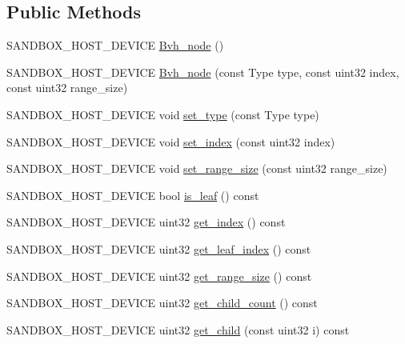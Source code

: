 \subsection*{Public Methods}
\begin{DoxyCompactItemize}
\item 
S\+A\+N\+D\+B\+O\+X\+\_\+\+H\+O\+S\+T\+\_\+\+D\+E\+V\+I\+CE \hyperlink{structsandbox_1_1_bvh__node_3_01_compact__bvh__tag_01_4_a1ace7c8c3d0c5ad6cca5fc6efa95a7bd}{Bvh\+\_\+node} ()
\item 
S\+A\+N\+D\+B\+O\+X\+\_\+\+H\+O\+S\+T\+\_\+\+D\+E\+V\+I\+CE \hyperlink{structsandbox_1_1_bvh__node_3_01_compact__bvh__tag_01_4_a9914c08eee2f15682cd6eba7d930ff07}{Bvh\+\_\+node} (const Type type, const uint32 index, const uint32 range\+\_\+size)
\item 
S\+A\+N\+D\+B\+O\+X\+\_\+\+H\+O\+S\+T\+\_\+\+D\+E\+V\+I\+CE void \hyperlink{structsandbox_1_1_bvh__node_3_01_compact__bvh__tag_01_4_a2b45390013155840bb1c19ede4a7cc10}{set\+\_\+type} (const Type type)
\item 
S\+A\+N\+D\+B\+O\+X\+\_\+\+H\+O\+S\+T\+\_\+\+D\+E\+V\+I\+CE void \hyperlink{structsandbox_1_1_bvh__node_3_01_compact__bvh__tag_01_4_a2e865b886cedb85a1c0b8c2e470e9719}{set\+\_\+index} (const uint32 index)
\item 
S\+A\+N\+D\+B\+O\+X\+\_\+\+H\+O\+S\+T\+\_\+\+D\+E\+V\+I\+CE void \hyperlink{structsandbox_1_1_bvh__node_3_01_compact__bvh__tag_01_4_adae271ac82a8cccff79c4686aa4a6c9c}{set\+\_\+range\+\_\+size} (const uint32 range\+\_\+size)
\item 
S\+A\+N\+D\+B\+O\+X\+\_\+\+H\+O\+S\+T\+\_\+\+D\+E\+V\+I\+CE bool \hyperlink{structsandbox_1_1_bvh__node_3_01_compact__bvh__tag_01_4_a500986abee989102e0acf42cf90245d2}{is\+\_\+leaf} () const
\item 
S\+A\+N\+D\+B\+O\+X\+\_\+\+H\+O\+S\+T\+\_\+\+D\+E\+V\+I\+CE uint32 \hyperlink{structsandbox_1_1_bvh__node_3_01_compact__bvh__tag_01_4_ae58332a51676665973e574bb61838f3e}{get\+\_\+index} () const
\item 
S\+A\+N\+D\+B\+O\+X\+\_\+\+H\+O\+S\+T\+\_\+\+D\+E\+V\+I\+CE uint32 \hyperlink{structsandbox_1_1_bvh__node_3_01_compact__bvh__tag_01_4_add480f55b45f3aaedba96da4488120ae}{get\+\_\+leaf\+\_\+index} () const
\item 
S\+A\+N\+D\+B\+O\+X\+\_\+\+H\+O\+S\+T\+\_\+\+D\+E\+V\+I\+CE uint32 \hyperlink{structsandbox_1_1_bvh__node_3_01_compact__bvh__tag_01_4_a507ae42faaac6f4691f0cfc582d85d52}{get\+\_\+range\+\_\+size} () const
\item 
S\+A\+N\+D\+B\+O\+X\+\_\+\+H\+O\+S\+T\+\_\+\+D\+E\+V\+I\+CE uint32 \hyperlink{structsandbox_1_1_bvh__node_3_01_compact__bvh__tag_01_4_af244133f74a887745ee5c7048f3b7bff}{get\+\_\+child\+\_\+count} () const
\item 
S\+A\+N\+D\+B\+O\+X\+\_\+\+H\+O\+S\+T\+\_\+\+D\+E\+V\+I\+CE uint32 \hyperlink{structsandbox_1_1_bvh__node_3_01_compact__bvh__tag_01_4_a249ef61691c3250aa9524546b295843a}{get\+\_\+child} (const uint32 i) const
\end{DoxyCompactItemize}
